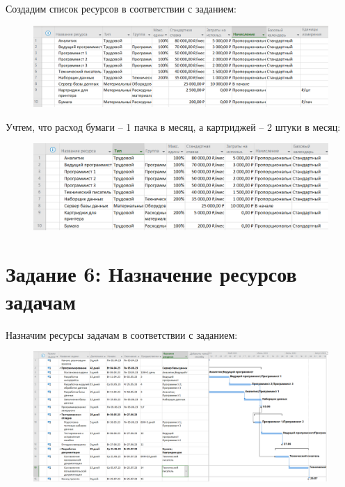 Создадим список ресурсов в соответствии с заданием:

\begin{figure}[H]
	\begin{center}
		\includegraphics[width=\textwidth]{imgs/task_5_0.png}
	\end{center}
\end{figure}

Учтем, что расход бумаги -- 1 пачка в месяц, а картриджей -- 2 штуки в месяц:

\begin{figure}[H]
	\begin{center}
		\includegraphics[width=\textwidth]{imgs/task_5_1.png}
	\end{center}
\end{figure}

\section*{Задание 6: Назначение ресурсов задачам}

Назначим ресурсы задачам в соответствии с заданием:

\begin{figure}[H]
	\begin{center}
		\includegraphics[width=\textwidth]{imgs/task_6_0.png}
	\end{center}
\end{figure}

